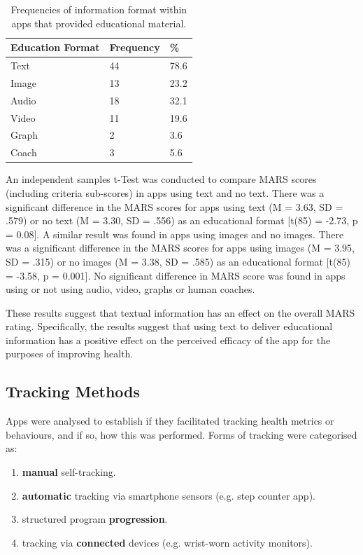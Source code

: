 \begin{table}[h]
\centering
\caption{Frequencies of information format within apps that provided educational material.}
\label{tbl: educationformat-frequencies}
\begin{tabular}{@{}lll@{}}
\toprule
Education Format & Frequency & \% \\ \midrule
Text & 44 & 78.6 \\
Image & 13 & 23.2 \\
Audio & 18 & 32.1 \\
Video & 11 & 19.6 \\
Graph & 2 & 3.6 \\
Coach & 3 & 5.6 \\ \bottomrule
\end{tabular}
\end{table}

An independent samples t-Test was conducted to compare MARS scores (including criteria sub-scores) in apps using text and no text. There was a significant difference in the MARS scores for apps using text (M = 3.63, SD = .579) or no text (M = 3.30, SD = .556) as an educational format [t(85) = -2.73, p = 0.08]. A similar result was found in apps using images and no images. There was a significant difference in the MARS scores for apps using images (M = 3.95, SD = .315) or no images (M = 3.38, SD = .585) as an educational format [t(85) = -3.58, p = 0.001]. No significant difference in MARS score was found in apps using or not using audio, video, graphs or human coaches.

These results suggest that textual information has an effect on the overall MARS rating. Specifically, the results suggest that using text to deliver educational information has a positive effect on the perceived efficacy of the app for the purposes of improving health.

\subsection{Tracking Methods}
Apps were analysed to establish if they facilitated tracking health metrics or behaviours, and if so, how this was performed. Forms of tracking were categorised as:
\begin{enumerate}[noitemsep,topsep=0pt]
\item \textbf{manual} self-tracking.
\item \textbf{automatic} tracking via smartphone sensors (e.g. step counter app).
\item structured program \textbf{progression}.
\item tracking via \textbf{connected} devices (e.g. wrist-worn activity monitors).
\end{enumerate}

